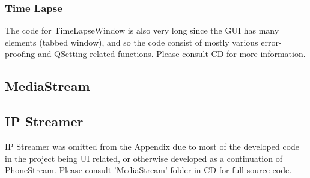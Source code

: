 \vspace{-20pt}
\begin{frame}{}

\end{frame}

%

%

%


\subsubsection{Time Lapse}
The code for TimeLapseWindow is also very long since the GUI has many elements (tabbed window), and so the code consist of mostly various error-proofing and QSetting related functions. Please consult CD for more information.

\vspace{-20pt}
\begin{frame}{}

\end{frame}

%


\subsection{MediaStream}
\subsection{IP Streamer}
IP Streamer was omitted from the Appendix due to most of the developed code in the project being UI related, or otherwise developed as a continuation of PhoneStream. Please consult 'MediaStream' folder in CD for full source code.

